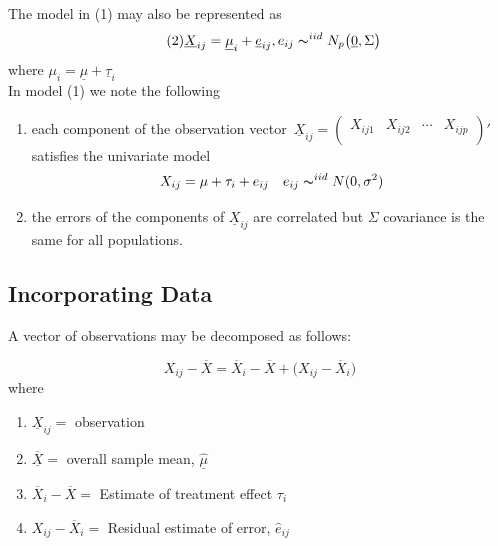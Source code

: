 \documentclass[11pt,a4paper]{article}
\theoremstyle{definition}
\begin{document}
The model in (1) may also be represented as \begin{equation}\tag{2}
\underline{X}_{ij} =\underline{\mu}_i + \underline{e}_{ij},  e_{ij}\thicksim^{iid}N_p\big(\underline{0},\Sigma\big)
\end{equation}
 where $\mu_i = \underline{\mu} + \underline{\tau}_i$\\
 
 In model (1) we note the following 
\begin{enumerate}
\item[$-$] each component of the observation vector 
\,$ \underline{X}_{ij}=
\begin{pmatrix}
X_{ij1} & X_{ij2} & \cdots& X_{ijp}\\
\end{pmatrix}'\,$ satisfies the univariate model $$X_{ij} = \mu + \tau_i + e_{ij} \quad  e_{ij} \thicksim^{iid} N(0,\sigma^2)$$
\item[$-$] the errors of the components of $\underline{X}_{ij}$ are correlated but $\Sigma$ covariance is the same for all populations.\\
\end{enumerate}



\subsection{Incorporating Data}
 A vector of observations may be decomposed as follows:

\begin{figure}[H]
\centering
{}
\end{figure}







\begin{equation}\tag{4}
X_{ij}-\overline{X} = \overline{X}_i-\overline{X} + \big(X_{ij} - \overline{X}_i\big)
\end{equation}
where
\begin{enumerate}
\item[] $\underline{X}_{ij}=$ observation
\item[] $\overline{\underline{X}}=$ overall sample mean, $\underline{\hat{\mu}}$
\item[] $\overline{X}_i- \overline{X} = $ Estimate of treatment effect $\tau_i$
\item[] $X_{ij} -\overline{X}_i =$ Residual estimate of error, $\hat{e}_{ij}$\\
\end{enumerate}
\end{document}
